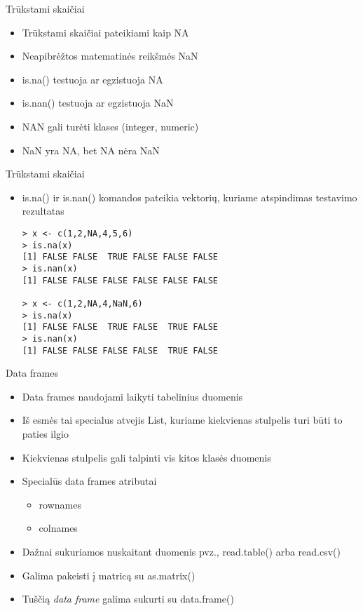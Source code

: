 \documentclass[11pt,xcolor=table]{beamer}
\begin{document}

\begin{frame}[fragile]{Trūkstami skaičiai}
\begin{itemize}
\item Trūkstami skaičiai pateikiami kaip NA
\item Neapibrėžtos matematinės reikšmės NaN
\item is.na() testuoja ar egzistuoja NA
\item is.nan() testuoja ar egzistuoja NaN
\item NAN gali turėti klases (integer, numeric)
\item NaN yra NA, bet NA nėra NaN
\end{itemize}
\end{frame}


\begin{frame}[fragile]{Trūkstami skaičiai}
\begin{itemize}
\item is.na() ir is.nan() komandos pateikia vektorių, kuriame atspindimas testavimo rezultatas
\begin{lstlisting}
> x <- c(1,2,NA,4,5,6)
> is.na(x)
[1] FALSE FALSE  TRUE FALSE FALSE FALSE
> is.nan(x)
[1] FALSE FALSE FALSE FALSE FALSE FALSE

> x <- c(1,2,NA,4,NaN,6)
> is.na(x)
[1] FALSE FALSE  TRUE FALSE  TRUE FALSE
> is.nan(x)
[1] FALSE FALSE FALSE FALSE  TRUE FALSE
\end{lstlisting}
\end{itemize}
\end{frame}


\begin{frame}[fragile]{Data frames}
\begin{itemize}
\item Data frames naudojami laikyti tabelinius duomenis
\item Iš esmės tai specialus atvejis List, kuriame kiekvienas stulpelis turi būti to paties ilgio
\item Kiekvienas stulpelis gali talpinti vis kitos klasės duomenis
\item Specialūs data frames atributai
\begin{itemize}
\item rownames
\item colnames
\end{itemize}
\item Dažnai sukuriamos nuskaitant duomenis pvz., read.table() arba read.csv()
\item Galima pakeisti į matricą su as.matrix()
\item Tuščią \textit{data frame} galima sukurti su data.frame()
\end{itemize}
\end{frame}
\end{document}
